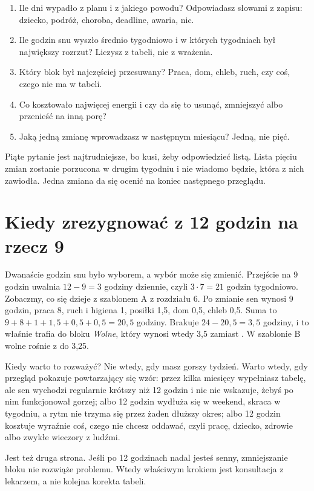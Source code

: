 \begin{enumerate}
\item Ile dni wypadło z planu i z jakiego powodu? Odpowiadasz słowami z zapisu: dziecko, podróż, choroba, deadline, awaria, nic.
\item Ile godzin snu wyszło średnio tygodniowo i w których tygodniach był największy rozrzut? Liczysz z tabeli, nie z wrażenia.
\item Który blok był najczęściej przesuwany? Praca, dom, chleb, ruch, czy coś, czego nie ma w tabeli.
\item Co kosztowało najwięcej energii i czy da się to usunąć, zmniejszyć albo przenieść na inną porę?
\item Jaką jedną zmianę wprowadzasz w następnym miesiącu? Jedną, nie pięć.
\end{enumerate}

Piąte pytanie jest najtrudniejsze, bo kusi, żeby odpowiedzieć listą. Lista pięciu zmian zostanie porzucona w drugim tygodniu i nie wiadomo będzie, która z nich zawiodła. Jedna zmiana da się ocenić na koniec następnego przeglądu.

\section{Kiedy zrezygnować z 12 godzin na rzecz 9}

Dwanaście godzin snu było wyborem, a wybór może się zmienić. Przejście na 9 godzin uwalnia $12 - 9 = 3$ godziny dziennie, czyli $3 \cdot 7 = 21$ godzin tygodniowo. Zobaczmy, co się dzieje z szablonem A z rozdziału 6. Po zmianie sen wynosi 9 godzin, praca 8, ruch i higiena 1, posiłki 1,5, dom 0,5, chleb 0,5. Suma to $9 + 8 + 1 + 1{,}5 + 0{,}5 + 0{,}5 = 20{,}5$ godziny. Brakuje $24 - 20{,}5 = 3{,}5$ godziny, i to właśnie trafia do bloku \emph{Wolne}, który wynosi wtedy 3,5 zamiast . W szablonie B wolne rośnie z  do 3,25.

Kiedy warto to rozważyć? Nie wtedy, gdy masz gorszy tydzień. Warto wtedy, gdy przegląd pokazuje powtarzający się wzór: przez kilka miesięcy wypełniasz tabelę, ale sen wychodzi regularnie krótszy niż 12 godzin i nic nie wskazuje, żebyś po nim funkcjonował gorzej; albo 12 godzin wydłuża się w weekend, skraca w tygodniu, a rytm nie trzyma się przez żaden dłuższy okres; albo 12 godzin kosztuje wyraźnie coś, czego nie chcesz oddawać, czyli pracę, dziecko, zdrowie albo zwykłe wieczory z ludźmi.

Jest też druga strona. Jeśli po 12 godzinach nadal jesteś senny, zmniejszanie bloku nie rozwiąże problemu. Wtedy właściwym krokiem jest konsultacja z lekarzem, a nie kolejna korekta tabeli.

